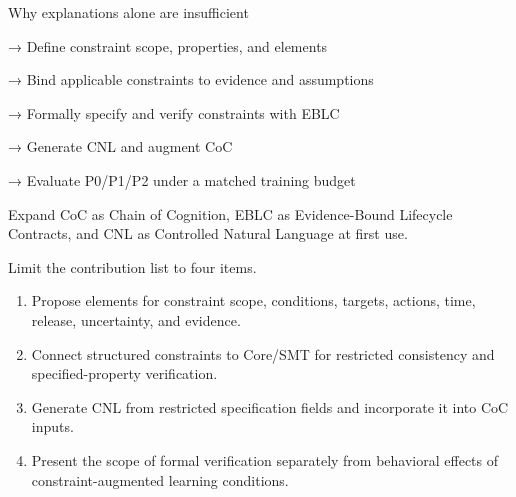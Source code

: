 \documentclass[11pt,a4paper]{article}
\begin{document}
\begingroup\small\ttfamily\setlength{\parskip}{1pt}
\noindent\hspace*{0.0em}Why explanations alone are insufficient\par
\noindent\hspace*{1.0em}→ Define constraint scope, properties, and elements\par
\noindent\hspace*{1.0em}→ Bind applicable constraints to evidence and assumptions\par
\noindent\hspace*{1.0em}→ Formally specify and verify constraints with EBLC\par
\noindent\hspace*{1.0em}→ Generate CNL and augment CoC\par
\noindent\hspace*{1.0em}→ Evaluate P0/P1/P2 under a matched training budget\par\endgroup\par

Expand CoC as Chain of Cognition, EBLC as Evidence-Bound Lifecycle Contracts, and CNL as Controlled Natural Language at first use.\par

Limit the contribution list to four items.\par

\begin{enumerate}
\item Propose elements for constraint scope, conditions, targets, actions, time, release, uncertainty, and evidence.
\item Connect structured constraints to Core/SMT for restricted consistency and specified-property verification.
\item Generate CNL from restricted specification fields and incorporate it into CoC inputs.
\item Present the scope of formal verification separately from behavioral effects of constraint-augmented learning conditions.
\end{enumerate}
\end{document}
